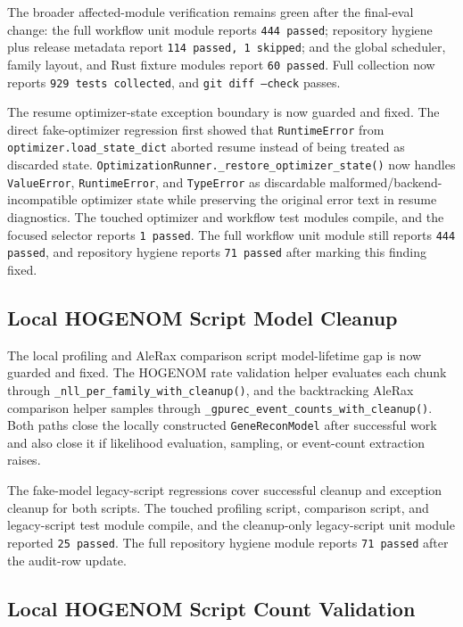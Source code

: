 \documentclass[11pt]{article}
\begin{document}
The broader affected-module verification remains green after the final-eval
change: the full workflow unit module reports \texttt{444 passed}; repository
hygiene plus release metadata report \texttt{114 passed, 1 skipped}; and the
global scheduler, family layout, and Rust fixture modules report
\texttt{60 passed}.  Full collection now reports \texttt{929 tests collected},
and \texttt{git diff --check} passes.

The resume optimizer-state exception boundary is now guarded and fixed.  The
direct fake-optimizer regression first showed that \texttt{RuntimeError} from
\texttt{optimizer.load\_state\_dict} aborted resume instead of being treated as
discarded state.  \texttt{OptimizationRunner.\_restore\_optimizer\_state()} now
handles \texttt{ValueError}, \texttt{RuntimeError}, and \texttt{TypeError} as
discardable malformed/backend-incompatible optimizer state while preserving the
original error text in resume diagnostics.  The touched optimizer and workflow
test modules compile, and the focused selector reports \texttt{1 passed}.
The full workflow unit module still reports \texttt{444 passed}, and repository
hygiene reports \texttt{71 passed} after marking this finding fixed.

\subsection{Local HOGENOM Script Model Cleanup}

The local profiling and AleRax comparison script model-lifetime gap is now
guarded and fixed.  The HOGENOM rate validation helper evaluates each chunk
through \texttt{\_nll\_per\_family\_with\_cleanup()}, and the backtracking
AleRax comparison helper samples through
\texttt{\_gpurec\_event\_counts\_with\_cleanup()}.  Both paths close the
locally constructed \texttt{GeneReconModel} after successful work and also close
it if likelihood evaluation, sampling, or event-count extraction raises.

The fake-model legacy-script regressions cover successful cleanup and exception
cleanup for both scripts.  The touched profiling script, comparison script, and
legacy-script test module compile, and the cleanup-only legacy-script unit
module reported \texttt{25 passed}.  The full repository hygiene module reports
\texttt{71 passed} after the audit-row update.

\subsection{Local HOGENOM Script Count Validation}
\end{document}
